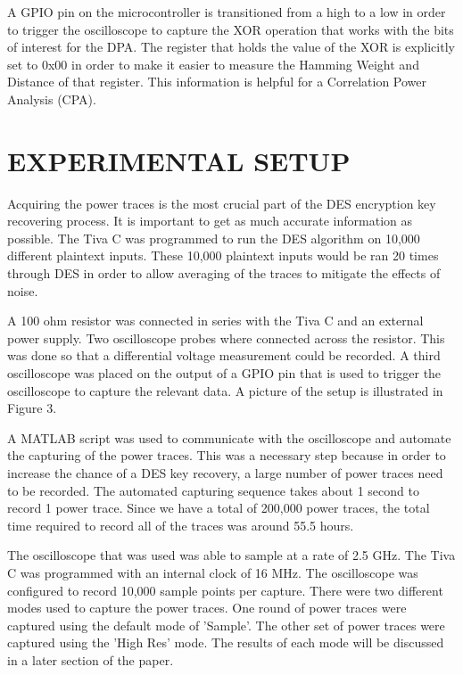 \documentclass[letterpaper, 10 pt, conference]{ieeeconf}  %
\begin{document}
\noindent
A GPIO pin on the microcontroller is transitioned from a high to a low in order to trigger the oscilloscope to capture the XOR operation that works with the bits of interest for the DPA.  The register that holds the value of the XOR is explicitly set to 0x00 in order to make it easier to measure the Hamming Weight and Distance of that register.  This information is helpful for a Correlation Power Analysis (CPA).

\section{EXPERIMENTAL SETUP}

Acquiring the power traces is the most crucial part of the DES encryption key recovering process.  It is important to get as much accurate information as possible.  The Tiva C was programmed to run the DES algorithm on 10,000 different plaintext inputs.  These 10,000 plaintext inputs would be ran 20 times through DES in order to allow averaging of the traces to mitigate the effects of noise.

A 100 ohm resistor was connected in series with the Tiva C and an external power supply.  Two oscilloscope probes where connected across the resistor.  This was done so that a differential voltage measurement could be recorded.  A third oscilloscope was placed on the output of a GPIO pin that is used to trigger the oscilloscope to capture the relevant data.  A picture of the setup is illustrated in Figure 3.

A MATLAB script was used to communicate with the oscilloscope and automate the capturing of the power traces.  This was a necessary step because in order to increase the chance of a DES key recovery, a large number of power traces need to be recorded.  The automated capturing sequence takes about 1 second to record 1 power trace.  Since we have a total of 200,000 power traces, the total time required to record all of the traces was around 55.5 hours.

The oscilloscope that was used was able to sample at a rate of 2.5 GHz.  The Tiva C was programmed with an internal clock of 16 MHz.  The oscilloscope was configured to record 10,000 sample points per capture.  There were two different modes used to capture the power traces.  One round of power traces were captured using the default mode of 'Sample'.  The other set of power traces were captured using the 'High Res' mode.  The results of each mode will be discussed in a later section of the paper.
\end{document}
